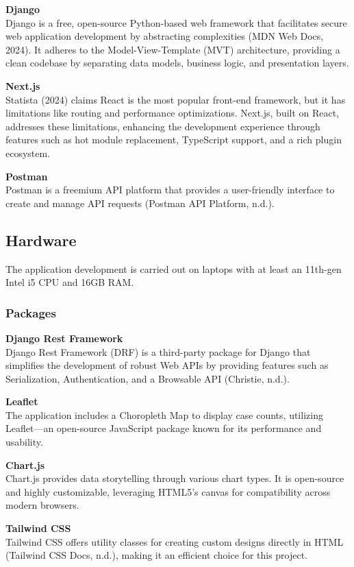 \textbf{Django} \\
Django is a free, open-source Python-based web framework that facilitates secure web application development by abstracting complexities (MDN Web Docs, 2024). It adheres to the Model-View-Template (MVT) architecture, providing a clean codebase by separating data models, business logic, and presentation layers.

\textbf{Next.js} \\
Statista (2024) claims React is the most popular front-end framework, but it has limitations like routing and performance optimizations. Next.js, built on React, addresses these limitations, enhancing the development experience through features such as hot module replacement, TypeScript support, and a rich plugin ecosystem.

\textbf{Postman} \\
Postman is a freemium API platform that provides a user-friendly interface to create and manage API requests (Postman API Platform, n.d.).

\subsection{Hardware}
The application development is carried out on laptops with at least an 11th-gen Intel i5 CPU and 16GB RAM.

\subsubsection{Packages}
\textbf{Django Rest Framework} \\
Django Rest Framework (DRF) is a third-party package for Django that simplifies the development of robust Web APIs by providing features such as Serialization, Authentication, and a Browsable API (Christie, n.d.).

\textbf{Leaflet} \\
The application includes a Choropleth Map to display case counts, utilizing Leaflet—an open-source JavaScript package known for its performance and usability.

\textbf{Chart.js} \\
Chart.js provides data storytelling through various chart types. It is open-source and highly customizable, leveraging HTML5's canvas for compatibility across modern browsers.

\textbf{Tailwind CSS} \\
Tailwind CSS offers utility classes for creating custom designs directly in HTML (Tailwind CSS Docs, n.d.), making it an efficient choice for this project.

